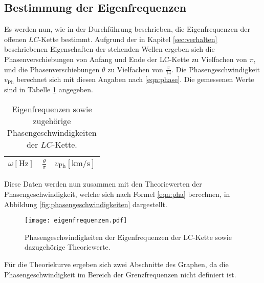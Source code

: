 \subsection{Bestimmung der Eigenfrequenzen}
Es werden nun, wie in der Durchführung beschrieben, die Eigenfrequenzen der offenen $LC$-Kette bestimmt.
Aufgrund der in Kapitel \ref{sec:verhalten} beschriebenen Eigenschaften der stehenden Wellen ergeben sich die Phasenverschiebungen von Anfang und Ende der LC-Kette zu Vielfachen von $\pi$, und die Phasenverschiebungen $\theta$ zu Vielfachen von $\frac{\pi}{14}$.
Die Phasengeschwindigkeit $v_{\text{Ph}}$ berechnet sich mit diesen Angaben nach \eqref{eqn:phase}.
Die gemessenen Werte sind in Tabelle \ref{tab:eigenfrequenzen} angegeben.
\begin{table}
  \centering
  \caption{Eigenfrequenzen sowie zugehörige Phasengeschwindigkeiten der $LC$-Kette.}
  \label{tab:eigenfrequenzen}
  \begin{tabular}{c c c}
    \toprule
    {$\omega [\si{\hertz}]$} & {$\frac{\theta}{\pi} $} & {$v_{\text{Ph}} [\si{\kilo\metre\per\second}] $}\\
    \midrule
    
    \bottomrule
  \end{tabular}
\end{table}
Diese Daten werden nun zusammen mit den Theoriewerten der Phasengeschwindigkeit, welche sich nach Formel \ref{eqn:pha} berechnen, in Abbildung \ref{fig:phasengeschwindigkeiten} dargestellt.
\begin{figure}[H]
  \centering
  \texttt{[image: eigenfrequenzen.pdf]}
  \caption{Phasengeschwindigkeiten der Eigenfrequenzen der LC-Kette sowie dazugehörige Theoriewerte.}
  \label{fig:dispersion_fertig}
\end{figure}
Für die Theoriekurve ergeben sich zwei Abschnitte des Graphen, da die Phasengeschwindigkeit im Bereich der Grenzfrequenzen nicht definiert ist.


